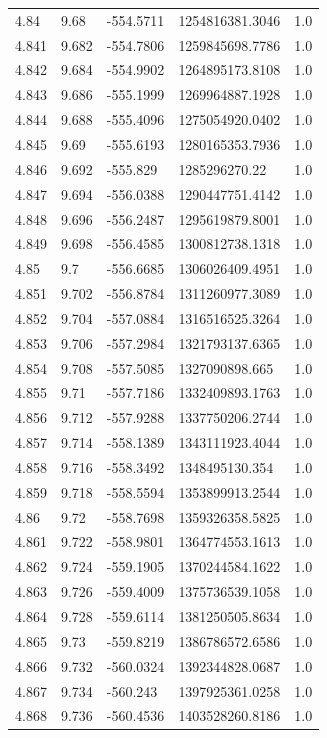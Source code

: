 \begin{tabular}{lllll}
4.84 & 9.68 & -554.5711 & 1254816381.3046 & 1.0 \\
4.841 & 9.682 & -554.7806 & 1259845698.7786 & 1.0 \\
4.842 & 9.684 & -554.9902 & 1264895173.8108 & 1.0 \\
4.843 & 9.686 & -555.1999 & 1269964887.1928 & 1.0 \\
4.844 & 9.688 & -555.4096 & 1275054920.0402 & 1.0 \\
4.845 & 9.69 & -555.6193 & 1280165353.7936 & 1.0 \\
4.846 & 9.692 & -555.829 & 1285296270.22 & 1.0 \\
4.847 & 9.694 & -556.0388 & 1290447751.4142 & 1.0 \\
4.848 & 9.696 & -556.2487 & 1295619879.8001 & 1.0 \\
4.849 & 9.698 & -556.4585 & 1300812738.1318 & 1.0 \\
4.85 & 9.7 & -556.6685 & 1306026409.4951 & 1.0 \\
4.851 & 9.702 & -556.8784 & 1311260977.3089 & 1.0 \\
4.852 & 9.704 & -557.0884 & 1316516525.3264 & 1.0 \\
4.853 & 9.706 & -557.2984 & 1321793137.6365 & 1.0 \\
4.854 & 9.708 & -557.5085 & 1327090898.665 & 1.0 \\
4.855 & 9.71 & -557.7186 & 1332409893.1763 & 1.0 \\
4.856 & 9.712 & -557.9288 & 1337750206.2744 & 1.0 \\
4.857 & 9.714 & -558.1389 & 1343111923.4044 & 1.0 \\
4.858 & 9.716 & -558.3492 & 1348495130.354 & 1.0 \\
4.859 & 9.718 & -558.5594 & 1353899913.2544 & 1.0 \\
4.86 & 9.72 & -558.7698 & 1359326358.5825 & 1.0 \\
4.861 & 9.722 & -558.9801 & 1364774553.1613 & 1.0 \\
4.862 & 9.724 & -559.1905 & 1370244584.1622 & 1.0 \\
4.863 & 9.726 & -559.4009 & 1375736539.1058 & 1.0 \\
4.864 & 9.728 & -559.6114 & 1381250505.8634 & 1.0 \\
4.865 & 9.73 & -559.8219 & 1386786572.6586 & 1.0 \\
4.866 & 9.732 & -560.0324 & 1392344828.0687 & 1.0 \\
4.867 & 9.734 & -560.243 & 1397925361.0258 & 1.0 \\
4.868 & 9.736 & -560.4536 & 1403528260.8186 & 1.0 \\

\end{tabular}

